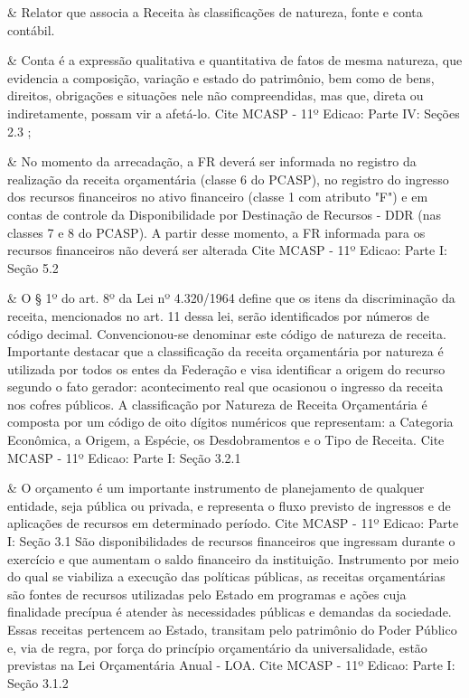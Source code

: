  &
Relator que associa a Receita às classificações de natureza, fonte e conta contábil. 
\\ \hline

 &
Conta é a expressão qualitativa e quantitativa de fatos de mesma natureza, que evidencia a composição, variação e estado do patrimônio, bem como de bens, direitos, obrigações e situações nele não compreendidas, mas que, direta ou indiretamente, possam vir a afetá-lo. Cite MCASP - 11º Edicao: Parte IV: Seções 2.3 ; 
\\ \hline

 &
No momento da arrecadação, a FR deverá ser informada no registro da realização da receita orçamentária (classe 6 do PCASP), no registro do ingresso dos recursos financeiros no ativo financeiro (classe 1 com atributo "F") e em contas de controle da Disponibilidade por Destinação de Recursos - DDR (nas classes 7 e 8 do PCASP). A partir desse momento, a FR informada para os recursos financeiros não deverá ser alterada Cite MCASP - 11º Edicao: Parte I: Seção 5.2 
\\ \hline

 &
O § 1º do art. 8º da Lei nº 4.320/1964 define que os itens da discriminação da receita, mencionados no art. 11 dessa lei, serão identificados por números de código decimal. Convencionou-se denominar este código de natureza de receita. Importante destacar que a classificação da receita orçamentária por natureza é utilizada por todos os entes da Federação e visa identificar a origem do recurso segundo o fato gerador: acontecimento real que ocasionou o ingresso da receita nos cofres públicos. A classificação por Natureza de Receita Orçamentária é composta por um código de oito dígitos numéricos que representam: a Categoria Econômica, a Origem, a Espécie, os Desdobramentos e o Tipo de Receita. Cite MCASP - 11º Edicao: Parte I: Seção 3.2.1 
\\ \hline

 &
O orçamento é um importante instrumento de planejamento de qualquer entidade, seja pública ou privada, e representa o fluxo previsto de ingressos e de aplicações de recursos em determinado período. Cite MCASP - 11º Edicao: Parte I: Seção 3.1 São disponibilidades de recursos financeiros que ingressam durante o exercício e que aumentam o saldo financeiro da instituição. Instrumento por meio do qual se viabiliza a execução das políticas públicas, as receitas orçamentárias são fontes de recursos utilizadas pelo Estado em programas e ações cuja finalidade precípua é atender às necessidades públicas e demandas da sociedade. Essas receitas pertencem ao Estado, transitam pelo patrimônio do Poder Público e, via de regra, por força do princípio orçamentário da universalidade, estão previstas na Lei Orçamentária Anual - LOA. Cite MCASP - 11º Edicao: Parte I: Seção 3.1.2 
\\ \hline

